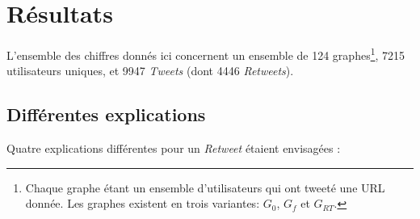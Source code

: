\documentclass[]{article}
\begin{document}
\section{Résultats}

L'ensemble des chiffres donnés ici concernent un ensemble de 124
graphes\footnote{Chaque graphe étant un ensemble d'utilisateurs qui ont
 tweeté une URL donnée. Les graphes existent en trois variantes: $G_{0}$,
 $G_{f}$ et $G_{RT}$.}, 7215 utilisateurs uniques, et 9947 \emph{Tweets}
(dont 4446 \emph{Retweets}).

\subsection{Différentes explications}

Quatre explications différentes pour un \emph{Retweet} étaient
envisagées :
\end{document}
